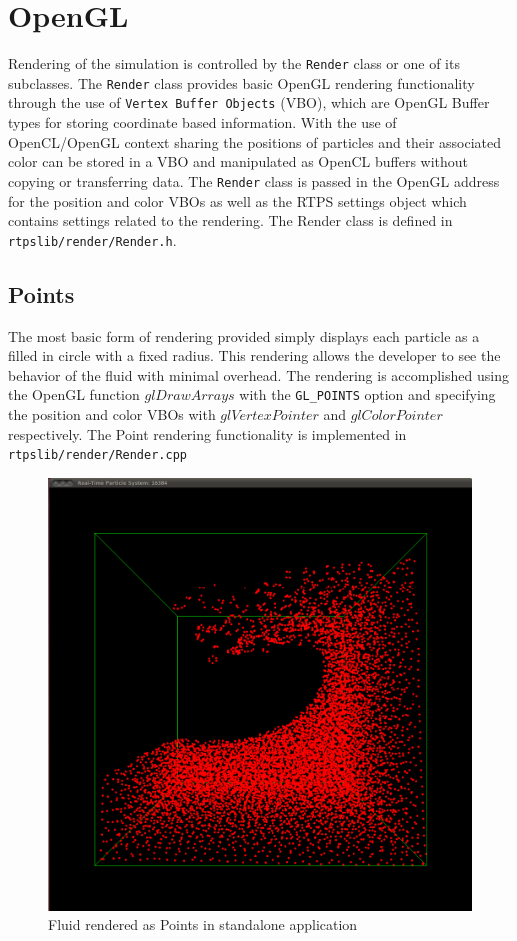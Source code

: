 \section{OpenGL}

Rendering of the simulation is controlled by the \verb|Render| class or one of
its subclasses. The \verb|Render| class provides basic OpenGL rendering
functionality through the use of \verb|Vertex Buffer Objects| (VBO), which are OpenGL
Buffer types for storing coordinate based information. With the use of
OpenCL/OpenGL context sharing the positions of particles and their associated
color can be stored in a VBO and manipulated as OpenCL buffers without copying
or transferring data. The \verb|Render| class is passed in the OpenGL address
for the position and color VBOs as well as the RTPS settings object which
contains settings related to the rendering. The Render class is defined in
\verb|rtpslib/render/Render.h|.


\subsection{Points}
The most basic form of rendering provided simply displays each particle as a
filled in circle with a fixed radius. This rendering allows the developer to
see the behavior of the fluid with minimal overhead. The rendering is
accomplished using the OpenGL function $glDrawArrays$ with the \verb|GL_POINTS|
option and specifying the position and color VBOs with $glVertexPointer$ and
$glColorPointer$ respectively. The Point rendering functionality is implemented
in \verb|rtpslib/render/Render.cpp|

\begin{figure}[!htc]
 		\centering
		\includegraphics[scale=0.2]{figures/standalone.png}
        \caption{ Fluid rendered as Points in standalone application }
		\label{fig:points}
\end{figure}



